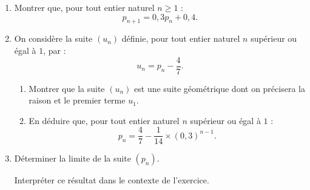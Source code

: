 \begin{enumerate}
\begin{center}
\begin{extern}
          \end{extern}
     \end{center}
     \item
     Montrer que, pour tout entier naturel $n \geqslant 1$ :
     \[ p_{n+1}=0,3p_n+0,4. \]
     \item
     On considère la suite $(u_n)$ définie, pour tout entier naturel $n$ supérieur ou égal à $1$, par :
     \[ u_n=p_n-\dfrac{4}{7}. \]
     \par
     \begin{enumerate}[label=\alph*.]
          \item
          Montrer que la suite $(u_n)$ est une suite géométrique dont on précisera la raison et le premier terme $u_1$.
          \item
          En déduire que, pour tout entier naturel $n$ supérieur ou égal à $1$ :
          \[ p_n=\dfrac{4}{7} - \dfrac{1}{14} \times (0,3)^{n-1}. \]
          \par
     \end{enumerate}
     \item
     Déterminer la limite de la suite $(p_n)$.
     \par
     Interpréter ce résultat dans le contexte de l'exercice.
     \par
\end{enumerate}
